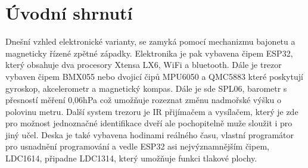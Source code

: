 \section{Úvodní shrnutí}

Dnešní vzhled elektronické varianty, se zamyká pomocí mechanizmu bajonetu a magneticky řízené zpětné západky. Elektronika je pak vybavena čipem ESP32,
který obsahuje dva procesory Xtensa LX6, WiFi a bluetooth. Dále je trezor vybaven čipem BMX055 nebo dvojicí čipů MPU6050 a QMC5883 které poskytují 
gyroskop, akcelerometr a magnetický kompas. Dále je sde SPL06, barometr s přesností měření 0,06hPa což umožňuje rozeznat změnu nadmořské výšku 
o polovinu metru. Další system trezoru je IR přijímačem a vysílačem, který je zde pro možnost jednoznačné identifikace dveří ale pochopitelně muže 
sloužit i pro jiný učel. Deska je také vybavena hodinami reálného času, vlastní programátor pro usnadnění programování a vedle ESP32 asi 
nejvýznamnějším čipem, LDC1614, připadne LDC1314, který umožňuje funkci tlakové plochy.

\begin{table}[h]
    \centering
    \caption{shrnutí elektronického vybavení}
    \label{tab:COMPARATION}
\end{table}

